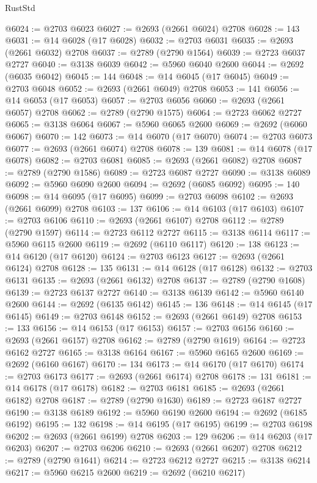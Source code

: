 \begin{lexlean}{RustStd}
\begin{coremodule}
{\begin{coremodule}
{{{{{{{{{{{{{{{{{{{{{{{{{{{{{{{{{{{{{{{@6024 := @2703 @6023
@6027 := @2693 (@2661 @6024) @2708
@6028 := 143
@6031 := @14 @6028 (@17 @6028)
@6032 := @2703 @6031
@6035 := @2693 (@2661 @6032) @2708
@6037 := @2789 (@2790 @1564)
@6039 := @2723 @6037 @2727
@6040 := @3138 @6039
@6042 := @5960 @6040 @2600
@6044 := @2692 (@6035 @6042)
@6045 := 144
@6048 := @14 @6045 (@17 @6045)
@6049 := @2703 @6048
@6052 := @2693 (@2661 @6049) @2708
@6053 := 141
@6056 := @14 @6053 (@17 @6053)
@6057 := @2703 @6056
@6060 := @2693 (@2661 @6057) @2708
@6062 := @2789 (@2790 @1575)
@6064 := @2723 @6062 @2727
@6065 := @3138 @6064
@6067 := @5960 @6065 @2600
@6069 := @2692 (@6060 @6067)
@6070 := 142
@6073 := @14 @6070 (@17 @6070)
@6074 := @2703 @6073
@6077 := @2693 (@2661 @6074) @2708
@6078 := 139
@6081 := @14 @6078 (@17 @6078)
@6082 := @2703 @6081
@6085 := @2693 (@2661 @6082) @2708
@6087 := @2789 (@2790 @1586)
@6089 := @2723 @6087 @2727
@6090 := @3138 @6089
@6092 := @5960 @6090 @2600
@6094 := @2692 (@6085 @6092)
@6095 := 140
@6098 := @14 @6095 (@17 @6095)
@6099 := @2703 @6098
@6102 := @2693 (@2661 @6099) @2708
@6103 := 137
@6106 := @14 @6103 (@17 @6103)
@6107 := @2703 @6106
@6110 := @2693 (@2661 @6107) @2708
@6112 := @2789 (@2790 @1597)
@6114 := @2723 @6112 @2727
@6115 := @3138 @6114
@6117 := @5960 @6115 @2600
@6119 := @2692 (@6110 @6117)
@6120 := 138
@6123 := @14 @6120 (@17 @6120)
@6124 := @2703 @6123
@6127 := @2693 (@2661 @6124) @2708
@6128 := 135
@6131 := @14 @6128 (@17 @6128)
@6132 := @2703 @6131
@6135 := @2693 (@2661 @6132) @2708
@6137 := @2789 (@2790 @1608)
@6139 := @2723 @6137 @2727
@6140 := @3138 @6139
@6142 := @5960 @6140 @2600
@6144 := @2692 (@6135 @6142)
@6145 := 136
@6148 := @14 @6145 (@17 @6145)
@6149 := @2703 @6148
@6152 := @2693 (@2661 @6149) @2708
@6153 := 133
@6156 := @14 @6153 (@17 @6153)
@6157 := @2703 @6156
@6160 := @2693 (@2661 @6157) @2708
@6162 := @2789 (@2790 @1619)
@6164 := @2723 @6162 @2727
@6165 := @3138 @6164
@6167 := @5960 @6165 @2600
@6169 := @2692 (@6160 @6167)
@6170 := 134
@6173 := @14 @6170 (@17 @6170)
@6174 := @2703 @6173
@6177 := @2693 (@2661 @6174) @2708
@6178 := 131
@6181 := @14 @6178 (@17 @6178)
@6182 := @2703 @6181
@6185 := @2693 (@2661 @6182) @2708
@6187 := @2789 (@2790 @1630)
@6189 := @2723 @6187 @2727
@6190 := @3138 @6189
@6192 := @5960 @6190 @2600
@6194 := @2692 (@6185 @6192)
@6195 := 132
@6198 := @14 @6195 (@17 @6195)
@6199 := @2703 @6198
@6202 := @2693 (@2661 @6199) @2708
@6203 := 129
@6206 := @14 @6203 (@17 @6203)
@6207 := @2703 @6206
@6210 := @2693 (@2661 @6207) @2708
@6212 := @2789 (@2790 @1641)
@6214 := @2723 @6212 @2727
@6215 := @3138 @6214
@6217 := @5960 @6215 @2600
@6219 := @2692 (@6210 @6217)
}}}}}}}}}}}}}}}}}}}}}}}}}}}}}}}}}}}}}}}
\end{coremodule}}
\end{coremodule}
\end{lexlean}
